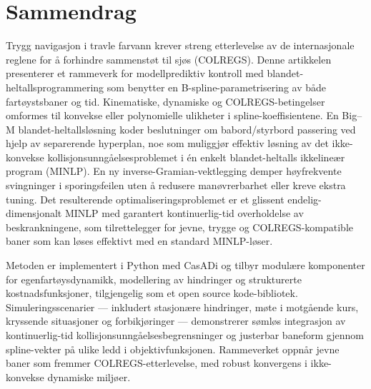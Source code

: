 \cleardoublepage

\section*{Sammendrag}
\vspace{0.5cm}

Trygg navigasjon i travle farvann krever streng etterlevelse av de internasjonale reglene for å forhindre sammenstøt til sjøs (COLREGS).
Denne artikkelen presenterer et rammeverk for modellprediktiv kontroll med blandet-heltallsprogrammering som benytter en B-spline-parametrisering av både fartøystsbaner og tid. Kinematiske, dynamiske og COLREGS-betingelser omformes til konvekse eller polynomielle ulikheter i spline-koeffisientene.
En Big–M blandet-heltallsløsning koder beslutninger om babord/styrbord passering ved hjelp av separerende hyperplan, noe som muliggjør effektiv løsning av det ikke-konvekse kollisjonsunngåelsesproblemet i én enkelt blandet-heltalls ikkelineær program (MINLP).
En ny inverse-Gramian-vektlegging demper høyfrekvente svingninger i sporingsfeilen uten å redusere manøvrerbarhet eller kreve ekstra tuning. Det resulterende optimaliseringsproblemet er et glissent endelig-dimensjonalt MINLP med garantert kontinuerlig-tid overholdelse av beskrankningene, som tilrettelegger for jevne, trygge og COLREGS-kompatible baner som kan løses effektivt med en standard MINLP-løser.

Metoden er implementert i Python med CasADi og tilbyr modulære komponenter for egenfartøysdynamikk, modellering av hindringer og strukturerte kostnadsfunksjoner, tilgjengelig som et open source kode-bibliotek. Simuleringsscenarier — inkludert stasjonære hindringer, møte i motgående kurs, kryssende situasjoner og forbikjøringer — demonstrerer sømløs integrasjon av kontinuerlig-tid kollisjonsunngåelsesbegrensninger og justerbar baneform gjennom spline-vekter på ulike ledd i objektivfunksjonen. Rammeverket oppnår jevne baner som fremmer COLREGS-etterlevelse, med robust konvergens i ikke-konvekse dynamiske miljøer.

\cleardoublepage